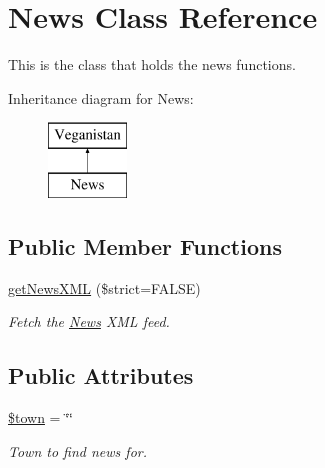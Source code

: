 \hypertarget{class_news}{}\section{News Class Reference}
\label{class_news}


This is the class that holds the news functions.  


Inheritance diagram for News\+:\begin{figure}[H]
\begin{center}
\leavevmode
\includegraphics[height=2.000000cm]{class_news}
\end{center}
\end{figure}
\subsection*{Public Member Functions}
\begin{DoxyCompactItemize}
\item 
\hyperlink{class_news_ae09b063136b3d937ff18a3fbf59a1110}{get\+News\+X\+M\+L} (\$strict=F\+A\+L\+S\+E)
\begin{DoxyCompactList}\small\item\em Fetch the \hyperlink{class_news}{News} X\+M\+L feed. \end{DoxyCompactList}\end{DoxyCompactItemize}
\subsection*{Public Attributes}
\begin{DoxyCompactItemize}
\item 
\hyperlink{class_news_a7edd0e2bb0d22b388b300fbcfb1bf424}{\$town} = \char`\"{}\char`\"{}
\begin{DoxyCompactList}\small\item\em Town to find news for. \end{DoxyCompactList}\end{DoxyCompactItemize}
